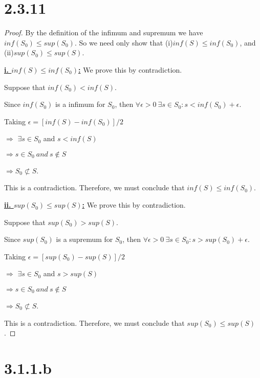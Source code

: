 \documentclass{article}
\begin{document}
\section*{2.3.11}
\begin{proof}
  By the definition of the infimum and supremum we have $inf(S_0) \leq sup(S_0)$. So we need only show that (i)$inf(S) \leq inf(S_0)$, and (ii)$sup(S_0) \leq sup(S)$.
  \newline

  \noindent
  \textbf{\underline{i. $inf(S) \leq inf(S_0)$:}}
  We prove this by contradiction.
  
  \noindent
  Suppose that $inf(S_0) < inf(S)$. 
  
  \noindent
  Since $inf(S_0)$ is a infimum for $S_0$, then $\forall \epsilon > 0 \ \exists s \in S_0: s < inf(S_0) + \epsilon$.
  
  \noindent
  Taking $\epsilon = [inf(S) - inf(S_0)] / 2$
  
  \noindent 
  $\Rightarrow$ $\exists s \in S_0$ and $s < inf(S)$
  
  \noindent
  $\Rightarrow s \in S_0 \ and \  s \notin S$

  \noindent
  $\Rightarrow S_0 \not\subset S$.
  
  \noindent
  This is a contradiction. Therefore, we must conclude that $inf(S) \leq inf(S_0)$.
  \newline

  \noindent
  \textbf{\underline{ii. $sup(S_0) \leq sup(S)$:}}
  We prove this by contradiction.
  
  \noindent
  Suppose that $sup(S_0) > sup(S)$. 
  
  \noindent
  Since $sup(S_0)$ is a supremum for $S_0$, then $\forall \epsilon > 0 \ \exists s \in S_0: s > sup(S_0) + \epsilon$.
  
  \noindent
  Taking $\epsilon = [sup(S_0) - sup(S)] / 2$
  
  \noindent 
  $\Rightarrow$ $\exists s \in S_0$ and $s > sup(S)$
  
  \noindent
  $\Rightarrow s \in S_0 \ and \  s \notin S$

  \noindent
  $\Rightarrow S_0 \not\subset S$.
  
  \noindent
  This is a contradiction. Therefore, we must conclude that $sup(S_0) \leq sup(S)$.

\end{proof}

\section*{3.1.1.b}
\end{document}
